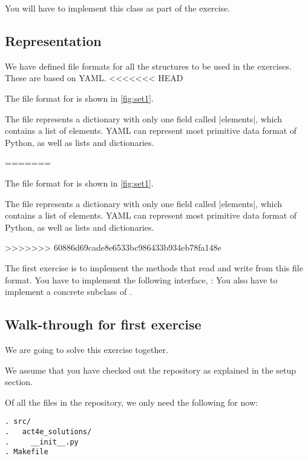 You will have to implement this class as part of the exercise.


\subsection*{Representation}

We have defined file formats for all the structures to be used in the exercises.
These are based on YAML\@.
<<<<<<< HEAD

The file format for  is shown in \cref{fig:set1}.


The file represents a dictionary with only one field called \pystr|elements|, which contains a list of elements.
YAML can represent most primitive data format of Python, as well as lists and dictionaries.

=======

The file format for  is shown in \cref{fig:set1}.


The file represents a dictionary with only one field called \pystr|elements|, which contains a list of elements.
YAML can represent most primitive data format of Python, as well as lists and dictionaries.

>>>>>>> 60886d69cade8e6533bc986433b934eb78fa148e
\begin{exercise}
  \label{ex:setrepr}
  The first exercise is to implement the methods that read and write from this file format.
  You have to implement the following interface, :
%
  You also have to implement a concrete subclass of .
\end{exercise}

\subsection{Walk-through for first exercise}

We are going to solve this exercise together.

We assume that you have checked out the repository as explained in the setup section.

Of all the files in the repository, we only need the following for now:

\begin{verbatim}
. src/
.   act4e_solutions/
.     __init__.py
. Makefile
\end{verbatim}


